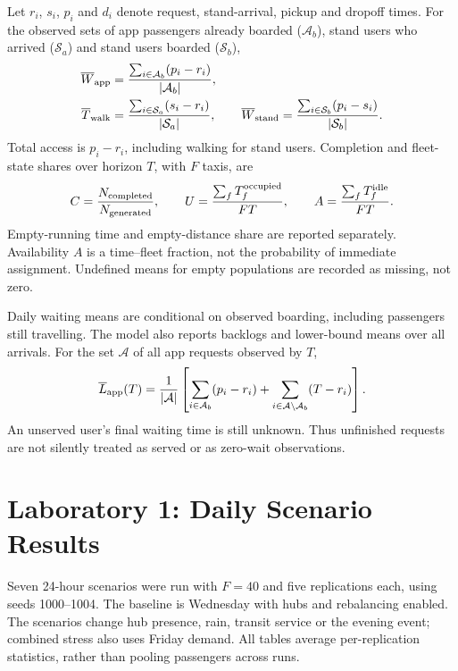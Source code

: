 \documentclass[10pt,twocolumn,letterpaper]{article}
\begin{document}
Let $r_i$, $s_i$, $p_i$ and $d_i$ denote request, stand-arrival, pickup and dropoff
times. For the observed sets of app passengers already boarded ($\mathcal A_b$),
stand users who arrived ($\mathcal S_a$) and stand users boarded ($\mathcal S_b$),
\begin{align}
 \overline W_{\rm app}&=\frac{\sum_{i\in\mathcal A_b}(p_i-r_i)}{|\mathcal A_b|},\label{eq:waiting}\\
 \overline T_{\rm walk}&=\frac{\sum_{i\in\mathcal S_a}(s_i-r_i)}{|\mathcal S_a|},\qquad
 \overline W_{\rm stand}=\frac{\sum_{i\in\mathcal S_b}(p_i-s_i)}{|\mathcal S_b|}.
 \label{eq:standmetrics}
\end{align}
Total access is $p_i-r_i$, including walking for stand users. Completion and
fleet-state shares over horizon $T$, with $F$ taxis, are
\begin{equation}
 C=\frac{N_{\rm completed}}{N_{\rm generated}},\qquad
 U=\frac{\sum_f T_f^{\rm occupied}}{FT},\qquad
 A=\frac{\sum_f T_f^{\rm idle}}{FT}.\label{eq:shares}
\end{equation}
Empty-running time and empty-distance share are reported separately. Availability
$A$ is a time--fleet fraction, not the probability of immediate assignment.
Undefined means for empty populations are recorded as missing, not zero.

Daily waiting means are conditional on observed boarding, including passengers
still travelling. The model also reports backlogs and lower-bound means over
all arrivals. For the set $\mathcal A$ of all app requests observed by $T$,
\begin{equation}
 \overline L_{\rm app}(T)=\frac{1}{|\mathcal A|}
 \left[\sum_{i\in\mathcal A_b}(p_i-r_i)
       +\sum_{i\in\mathcal A\setminus\mathcal A_b}(T-r_i)\right].
 \label{eq:lowerbound}
\end{equation}
An unserved user's final waiting time is still unknown. Thus unfinished
requests are not silently treated as served or as zero-wait observations.

\section{Laboratory 1: Daily Scenario Results}
Seven 24-hour scenarios were run with $F=40$ and five replications each, using
seeds 1000--1004. The baseline is Wednesday with hubs and rebalancing enabled.
The scenarios change hub presence, rain, transit service or the evening event;
combined stress also uses Friday demand. All tables average per-replication
statistics, rather than pooling passengers across runs.
\end{document}
